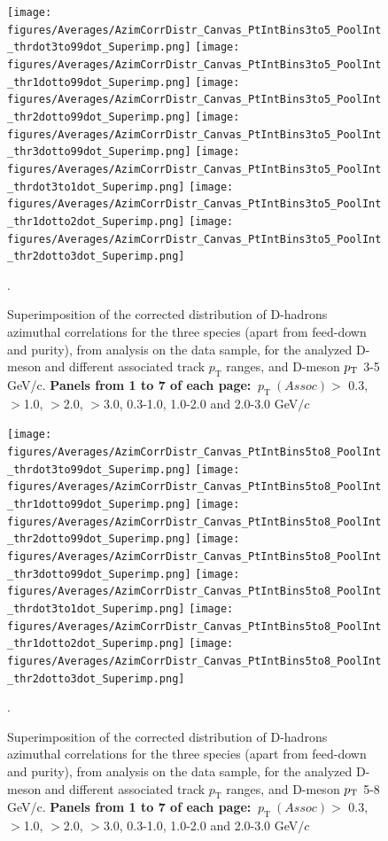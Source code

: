 \clearpage
\newpage

\begin{figure}[!htbp]
\centering
{\texttt{[image: figures/Averages/AzimCorrDistr\_Canvas\_PtIntBins3to5\_PoolInt\_thrdot3to99dot\_Superimp.png]}}
{\texttt{[image: figures/Averages/AzimCorrDistr\_Canvas\_PtIntBins3to5\_PoolInt\_thr1dotto99dot\_Superimp.png]}}
{\texttt{[image: figures/Averages/AzimCorrDistr\_Canvas\_PtIntBins3to5\_PoolInt\_thr2dotto99dot\_Superimp.png]}}
{\texttt{[image: figures/Averages/AzimCorrDistr\_Canvas\_PtIntBins3to5\_PoolInt\_thr3dotto99dot\_Superimp.png]}}
{\texttt{[image: figures/Averages/AzimCorrDistr\_Canvas\_PtIntBins3to5\_PoolInt\_thrdot3to1dot\_Superimp.png]}}
{\texttt{[image: figures/Averages/AzimCorrDistr\_Canvas\_PtIntBins3to5\_PoolInt\_thr1dotto2dot\_Superimp.png]}}
{\texttt{[image: figures/Averages/AzimCorrDistr\_Canvas\_PtIntBins3to5\_PoolInt\_thr2dotto3dot\_Superimp.png]}}
\caption{Superimposition of the corrected distribution of D-hadrons azimuthal correlations for the three species (apart from feed-down and purity), from analysis on the data sample, for the analyzed D-meson and different associated track $p_\text{T}$ ranges, and D-meson $p_{\rm T}$ 3-5 GeV/c. \textbf{Panels from 1 to 7 of each page:} $ \ p_\text{T}~(Assoc)>$ 0.3, $>$1.0, $>$2.0, $>$3.0, 0.3-1.0, 1.0-2.0 and 2.0-3.0 GeV$/c$}.
\label{fig:Data_Res_D0DpDs}
\end{figure}
\newpage
\begin{figure}
\centering
{\texttt{[image: figures/Averages/AzimCorrDistr\_Canvas\_PtIntBins5to8\_PoolInt\_thrdot3to99dot\_Superimp.png]}}
{\texttt{[image: figures/Averages/AzimCorrDistr\_Canvas\_PtIntBins5to8\_PoolInt\_thr1dotto99dot\_Superimp.png]}}
{\texttt{[image: figures/Averages/AzimCorrDistr\_Canvas\_PtIntBins5to8\_PoolInt\_thr2dotto99dot\_Superimp.png]}}
{\texttt{[image: figures/Averages/AzimCorrDistr\_Canvas\_PtIntBins5to8\_PoolInt\_thr3dotto99dot\_Superimp.png]}}
{\texttt{[image: figures/Averages/AzimCorrDistr\_Canvas\_PtIntBins5to8\_PoolInt\_thrdot3to1dot\_Superimp.png]}}
{\texttt{[image: figures/Averages/AzimCorrDistr\_Canvas\_PtIntBins5to8\_PoolInt\_thr1dotto2dot\_Superimp.png]}}
{\texttt{[image: figures/Averages/AzimCorrDistr\_Canvas\_PtIntBins5to8\_PoolInt\_thr2dotto3dot\_Superimp.png]}}
\caption{Superimposition of the corrected distribution of D-hadrons azimuthal correlations for the three species (apart from feed-down and purity), from analysis on the data sample, for the analyzed D-meson and different associated track $p_\text{T}$ ranges, and D-meson $p_{\rm T}$ 5-8 GeV/c. \textbf{Panels from 1 to 7 of each page:} $ \ p_\text{T}~(Assoc)>$ 0.3, $>$1.0, $>$2.0, $>$3.0, 0.3-1.0, 1.0-2.0 and 2.0-3.0 GeV$/c$}.
\label{fig:Data_Res_D0DpDs2}
\end{figure}
